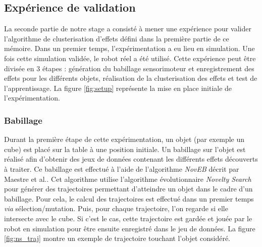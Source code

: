 \documentclass{llncs}
\newcommand*\circled[1]{\tikz[baseline=(char.base)]{
            \node[shape=circle,draw,inner sep=2pt] (char) {#1};}}
\begin{document}
\subsection{Expérience de validation}
La seconde partie de notre stage a consisté à mener une expérience pour valider l'algorithme de clusterisation d'effets défini dans la première partie de ce mémoire. Dans un premier temps, l'expérimentation a eu lieu en simulation. Une fois cette simulation validée, le robot réel a été utilisé. Cette expérience peut être divisée en 3 étapes : \circled{1} génération du babillage sensorimoteur et enregistrement des effets pour les différents objets, \circled{2} réalisation de la clusterisation des effets et \circled{3} test de l'apprentissage.  La figure \ref{fig:setup} représente la mise en place initiale de l'expérimentation.

\subsubsection{Babillage}
Durant la première étape de cette expérimentation, un objet (par exemple un cube) est placé sur la table à une position initiale. Un babillage sur l'objet est réalisé afin d'obtenir des jeux de données contenant les différents effets découverts à traiter. Ce babillage est effectué à l'aide de l'algorithme \textit{NovEB} décrit par Maestre et al.\cite{Maestre2015}. Cet algorithme utilise l'algorithme évolutionnaire \textit{Novelty Search}\cite{5949955} pour générer des trajectoires permettant d'atteindre un objet dans le cadre d'un babillage. Pour cela, le calcul des trajectoires est effectué dans un premier temps \textit{via} sélection/mutation. Puis, pour chaque trajectoire, l'on regarde si elle intersecte avec le cube. Si c'est le cas, cette trajectoire est gardée et jouée par le robot en simulation pour être ensuite enregistré dans le jeu de données. La figure \ref{fig:ns_traj} montre un exemple de trajectoire touchant l'objet considéré.
\end{document}
